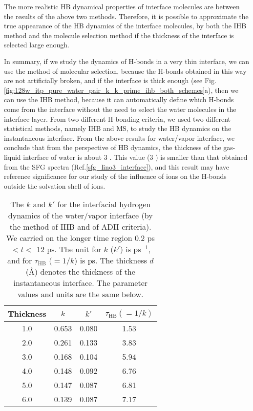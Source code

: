 {The more realistic HB dynamical properties of interface molecules are between the results of the above two methods. 
Therefore, it is possible to approximate the true appearance of the HB dynamics of the interface molecules, 
by both the IHB method and the molecule selection method if the thickness of the interface is selected large enough. 

In summary, if we study the dynamics of H-bonds in a very thin interface, we can use the method of molecular selection, 
because the H-bonds obtained in this way are not artificially broken, and if the interface is thick enough  
(see Fig.\thinspace\ref{fig:128w_itp_pure_water_pair_k_k_prime_ihb_both_schemes}a), then we can use the IHB method, because it can automatically define which H-bonds come 
from the interface without the need to select the water molecules in the interface layer.
From two different H-bonding criteria, we used two different statistical methods, namely IHB and MS, 
to study the HB dynamics on the instantaneous interface. From the above results for water/vapor interface, we conclude that from the perspective of HB dynamics,
the thickness of the gas-liquid interface of water is about 3 \A. This value (3 \A) is smaller than that obtained from the SFG spectra 
(Ref.\thinspace\ref{sfg_lino3_interface}), and this result may have reference significance for our study of the influence of ions on the H-bonds 
outside the solvation shell of ions.
%
\begin{table}[htb]
\centering
\caption{\label{tab:k_k_prime_tau_128w_pure_ihb_ADH} 
    The $k$ and $k'$ for the interfacial hydrogen dynamics of the water/vapor interface (by the method of IHB and of ADH criteria). 
We carried on the longer time region 0.2 ps $< t <$ 12 ps. The unit for $k$ ($k'$) is ps$^{-1}$, and for $\tau_{\text{HB}}$ ($=1/k$) 
is ps. The thickness $d$ (\AA) denotes the thickness of the instantaneous interface. The parameter values and units are the same below.} 
\begin{tabular}{cccc}
 Thickness & $k$ & $k'$ & $\tau_{\text{HB}} (=1/k)$ \\
\hline
  1.0 & 0.653 & 0.080 & 1.53  \\
  2.0 & 0.261 & 0.133 & 3.83  \\
  3.0 & 0.168 & 0.104 & 5.94  \\
  4.0 & 0.148 & 0.092 & 6.76  \\
  5.0 & 0.147 & 0.087 & 6.81  \\
  6.0 & 0.139 & 0.087 & 7.17  \\
\end{tabular}

\end{table}}
